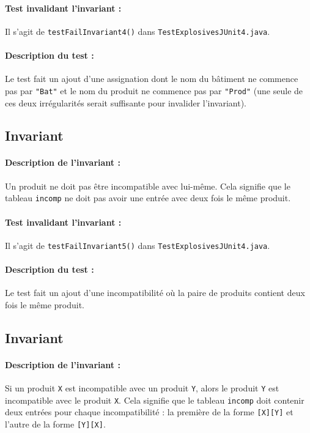 \documentclass{article}
\begin{document}
\vspace{-0.2cm}
\paragraph{Test invalidant l'invariant :} Il s'agit de \texttt{testFailInvariant4()} dans \texttt{TestExplosivesJUnit4.java}.

\vspace{-0.2cm}
\paragraph{Description du test :} Le test fait un ajout d'une assignation dont le nom du bâtiment ne commence pas par \texttt{"Bat"} et le nom du produit ne commence pas par \texttt{"Prod"} (une seule de ces deux irrégularités serait suffisante pour invalider l'invariant).

\subsection{Invariant }

\paragraph{Description de l'invariant :} Un produit ne doit pas être incompatible avec lui-même. Cela signifie que le tableau \texttt{incomp} ne doit pas avoir une entrée avec deux fois le même produit.

\vspace{-0.2cm}
\paragraph{Test invalidant l'invariant :} Il s'agit de \texttt{testFailInvariant5()} dans \texttt{TestExplosivesJUnit4.java}.

\vspace{-0.2cm}
\paragraph{Description du test :} Le test fait un ajout d'une incompatibilité où la paire de produits contient deux fois le même produit.

\subsection{Invariant }

\paragraph{Description de l'invariant :} Si un produit \texttt{X} est incompatible avec un produit \texttt{Y}, alors le produit \texttt{Y} est incompatible avec le produit \texttt{X}. Cela signifie que le tableau \texttt{incomp} doit contenir deux entrées pour chaque incompatibilité : la première de la forme \texttt{[X][Y]} et l'autre de la forme \texttt{[Y][X]}.
\end{document}
